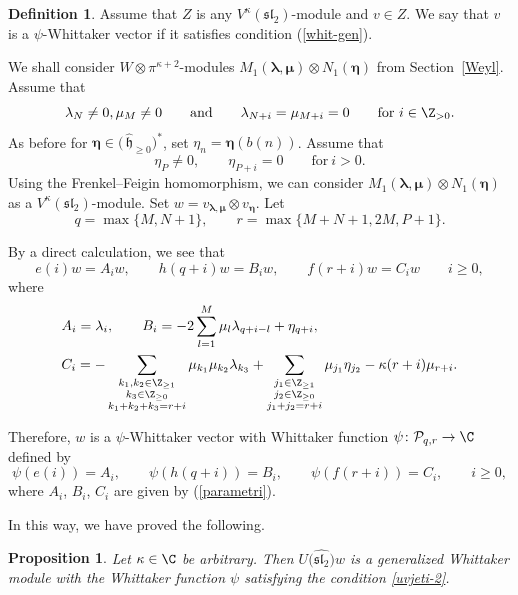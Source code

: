 \documentclass[pdftex]{sigma}
\numberwithin{equation}{section}
\newtheorem{Proposition}[Theorem]{Proposition}
\theoremstyle{definition}
\newtheorem{Definition}[Theorem]{Definition}
\let\frak\mathfrak
\newcommand{\1}{\textbf{1}}
\begin{document}
\begin{Definition}Assume that $Z$ is any $V^{\kappa}(\mathfrak{sl}_2)$-module and $v \in Z$. We say that $v$ is a $\psi$\nobreakdash-Whit\-tak\-er vector if it satisfies condition (\ref{whit-gen}).
 \end{Definition}

We shall consider $W \otimes \pi^{\kappa +2}$-modules $M_{1} (\bm{\lambda}, \bm{\mu}) \otimes N_1(\bm{\eta})$ from Section~\ref{Weyl}. Assume that
 \[ \lambda_N \ne 0, \mu_M \ne 0 \qquad \mbox{and} \qquad \lambda_{N+ i} = \mu_{M+i} = 0 \qquad \mbox{for} \ i \in {\Z}_{>0}. \]
As before for $\bm{\eta} \in \bigl(\, \widehat{\mathfrak h}_{\ge 0}\bigr) ^*$, set $\eta_n = \bm{\eta} (b(n))$. Assume that
 \[ \eta_P \ne 0, \qquad \eta_{P+i } =0 \qquad \mbox{for} \ i >0. \]
Using the Frenkel--Feigin homomorphism, we can consider $M_{1} (\bm{\lambda}, \bm{\mu}) \otimes N_1(\bm{\eta})$ as a $V^{\kappa} (\mathfrak{sl}_2)$-module.
Set $w = v_{\bm{\lambda}, \bm{\mu}} \otimes v_{\bm{\eta}}$.
Let
 \[ q = \max \{ M, N+ 1\}, \qquad r = \max \{M+N+1, 2M, P+1\}. \]

By a direct calculation, we see that
\begin{equation*}%
e(i)w=A_iw, \qquad h(q+i)w=B_iw, \qquad f(r+i)w=C_iw \qquad i\ge0,
\end{equation*}
where
\begin{align}
&A_i= \lambda_i,\qquad
B_i = -2\sum_{l=1}^M\mu_l\lambda_{q+i-l}+\eta_{q+i},\nonumber\\
&C_i= -\sum_{\substack{k_1,k_2\in {\Z}_{\ge1}\\ k_3\in {\Z}_{\ge0}\\ k_1+k_2+k_3=r+i}}
\mu_{k_1}\mu_{k_2}\lambda_{k_3}
+\sum_{\substack{j_1\in {\Z}_{\ge1}\\ j_2\in {\Z}_{\ge0}\\ j_1+j_2=r+i}}
\mu_{j_1}\eta_{j_2}-\kappa(r+i)\mu_{r+i}.\label{parametri}
\end{align}


 Therefore, $w$ is a $\psi$-Whittaker vector with Whittaker function $\psi \colon \mathcal P_{q,r} \rightarrow \C$ defined by
\begin{equation}\label{uvjeti-2}
\psi(e(i))=A_i, \qquad \psi(h(q+i))=B_i, \qquad \psi(f(r+i))=C_i, \qquad i\ge0,
\end{equation}
 where $A_i$, $B_i$, $C_i$ are given by (\ref{parametri}).

 In this way, we have proved the following.

 \begin{Proposition}
 Let $
\kappa \in {\C}$ be arbitrary. Then $U\bigl(\widehat{\frak{sl}_2}\bigr)w$ is a generalized Whittaker module with the Whittaker function $\psi$ satisfying the condition \eqref{uvjeti-2}.
 \end{Proposition}
\end{document}

